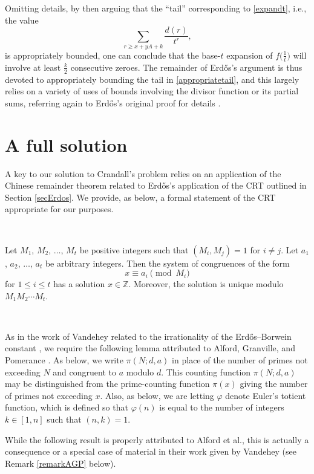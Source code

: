 \documentclass[12pt]{article}
\begin{document}
 Omitting details, by then arguing that the ``tail'' corresponding to \eqref{expandt}, i.e., the value
\begin{equation}\label{appropriatetail}
 \sum_{r \geq x + y A + k} \frac{d(r)}{t^r}, 
\end{equation}
 is appropriately bounded, one can conclude that the base-$t$ expansion of $f\big( \frac{1}{t} \big)$ will involve at least $\frac{k}{2}$ 
 consecutive zeroes. The remainder of Erd\H{o}s's argument is thus devoted to appropriately bounding the tail in 
 \eqref{appropriatetail}, and this largely relies on a variety of uses of bounds involving the divisor function or its partial sums, 
 referring again to Erd\H{o}s's original proof for details \cite{Erdos1948}. 

 \section{A full solution}
 A key to our solution to Crandall's problem relies on an application of the Chinese remainder theorem related to Erd\H{o}s's application 
 of the CRT \cite{Erdos1948} outlined in Section \ref{secErdos}. 
 We provide, as below, a formal statement of the CRT 
 appropriate for our purposes. 

 \ 

 Let $M_{1}$, $M_{2}$, $\ldots$, $M_t$ be positive integers such that $(M_i, M_j) = 1$ for $i 
 \neq j$. Let $a_1$, $a_2$, $\ldots$, $a_t$ be arbitrary integers. Then the system of congruences of the form 
 $$ x \equiv a_i \pmod {{M}_{i}} $$
 for $1 \leq i \leq t$ has a solution $x \in \mathbb{Z}$. Moreover, 
 the solution is unique modulo $M_1 M_2 \cdots M_t$. 

 \ 

 As in the work of Vandehey related to the irrationality of the Erd\H{o}s--Borwein constant \cite{Vandehey2013}, we require the following 
 lemma attributed to Alford, Granville, and Pomerance \cite{AlfordGranvillePomerance1994}. As below, we write $\pi(N; d, a)$ in place 
 of the number of primes not exceeding $N$ and congruent to $a$ modulo $d$. This 
 counting function $\pi(N; d, a)$ 
 may be distinguished from the prime-counting function $\pi(x)$ giving the number of primes not 
 exceeding $x$. Also, as below, we are letting $\varphi$ denote Euler's totient 
 function, which is defined so that $\varphi(n)$ is equal to the number of integers $k \in [1, n]$ such that $(n, k) = 1$. 
 
 While the following result is properly attributed to 
 Alford et al., this is actually a consequence or a special case of
 material in their work given by Vandehey (see Remark \ref{remarkAGP} below). 
 
\end{document}
